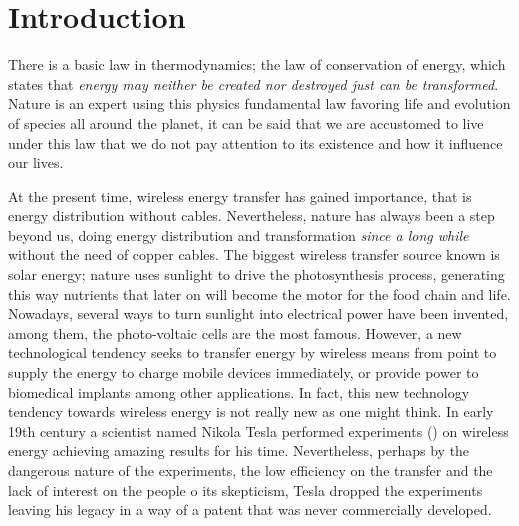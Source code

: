 \documentclass{intech}
\affiliation{Universidad Veracruzana \\ Facultad de Instrumentaci\'on Electr\'onica}
\begin{document}
\maketitle

\section{Introduction}

There is a basic law in thermodynamics; the law of conservation of energy, which states that {\it energy may neither be created nor destroyed just can be transformed}. Nature is an expert using this physics fundamental law favoring life and evolution of species all around the planet, it can be said that we are accustomed to live under this law that we do not pay attention to its existence and how it influence our lives.

At the present time, wireless energy transfer has gained importance, that is energy distribution without cables. Nevertheless, nature has always been a step beyond us, doing energy distribution and transformation {\it since a long while} without the need of copper cables. The biggest wireless transfer source known is solar energy; nature uses sunlight to drive the photosynthesis process, generating this way nutrients that later on will become the motor for the food chain and life. Nowadays, several ways to turn sunlight into electrical power have been invented, among them, the photo-voltaic cells are the most famous. However, a new technological tendency seeks to transfer energy by wireless means from point to supply the energy to charge mobile devices immediately, or provide power to biomedical implants among other applications. In fact, this new technology tendency towards wireless energy is not really new as one might think. In early 19th century a scientist named Nikola Tesla performed experiments (\cite{RES20}) on wireless energy achieving amazing results for his time. Nevertheless, perhaps by the dangerous nature of the experiments, the low efficiency on the transfer and the lack of interest on the people o its skepticism, Tesla dropped the experiments leaving his legacy in a way of a patent that was never commercially developed.
\end{document}
